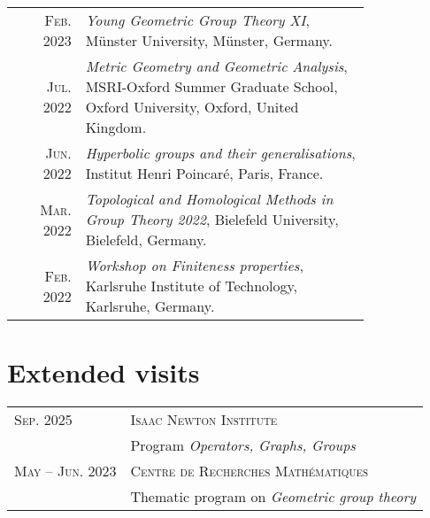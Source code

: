 \documentclass[a4paper,11pt]{article} %
\begin{document}
\begin{longtable}{rp{0.8\linewidth}}
    \textsc{Feb. 2023} & \emph{Young Geometric Group Theory XI}, Münster University, Münster, Germany. \\ %

    \textsc{Jul. 2022} & \emph{Metric Geometry and Geometric Analysis}, MSRI-Oxford Summer Graduate
    School, Oxford University, Oxford, United Kingdom. \\ %

    \textsc{Jun. 2022} & \emph{Hyperbolic groups and their generalisations}, Institut Henri Poincaré, Paris,
    France. \\ %

    \textsc{Mar. 2022} & \emph{Topological and Homological Methods in Group Theory 2022}, Bielefeld University, Bielefeld, Germany. \\ %
    
    \textsc{Feb. 2022} & \emph{Workshop on Finiteness properties}, Karlsruhe Institute of Technology, Karlsruhe, Germany. \\ %

\end{longtable}



\section{Extended visits}

\begin{longtable}{>{\raggedleft\arraybackslash}p{4cm}p{10cm}}

\textsc{Sep. 2025} &\textsc{Isaac Newton Institute} \\ &Program \emph{Operators, Graphs, Groups} \vspace{0.5em}\\

\textsc{May -- Jun. 2023} &\textsc{Centre de Recherches Mathématiques} \\ & Thematic program on \emph{Geometric group theory}

\end{longtable}

\end{document}
